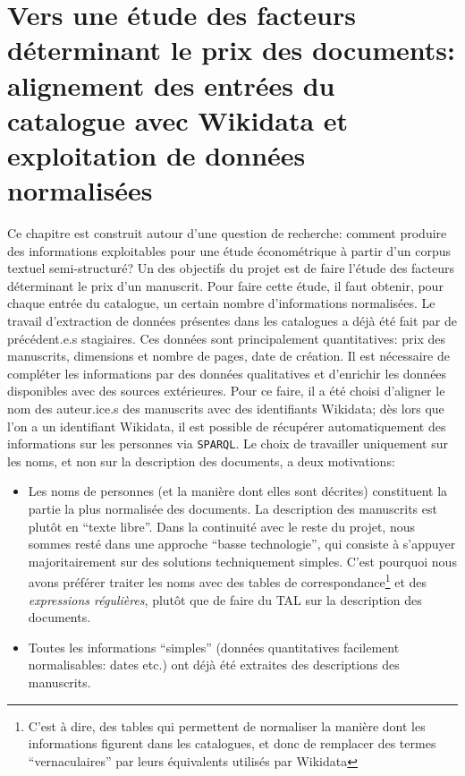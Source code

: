 \documentclass[a4paper, 12pt, twoside]{book}
\newcommand{\rgx}{\textit{expressions régulières}}
\newcommand{\sparql}{\texttt{SPARQL}}
\begin{document}
\chapter{Vers une étude des facteurs déterminant le prix des documents: alignement des entrées du catalogue avec Wikidata et exploitation de données normalisées}
Ce chapitre est construit autour d'une question de recherche: comment produire des informations exploitables pour une étude économétrique à partir d'un corpus textuel semi-structuré? Un des objectifs du projet est de faire l'étude des facteurs déterminant le prix d'un manuscrit. Pour faire cette étude, il faut obtenir, pour chaque entrée du catalogue, un certain nombre d'informations normalisées. Le travail d'extraction de données présentes dans les catalogues a déjà été fait par de précédent.e.s stagiaires. Ces données sont principalement quantitatives: prix des manuscrits, dimensions et nombre de pages, date de création. Il est nécessaire de compléter les informations par des données qualitatives et d'enrichir les données disponibles avec des sources extérieures. Pour ce faire, il a été choisi d'aligner le nom des auteur.ice.s des manuscrits avec des identifiants Wikidata; dès lors que l'on a un identifiant Wikidata, il est possible de récupérer automatiquement des informations sur les personnes via \sparql. Le choix de travailler uniquement sur les noms, et non sur la description des documents, a deux motivations:
\begin{itemize}
 \item Les noms de personnes (et la manière dont elles sont décrites) constituent la partie la plus normalisée des documents. La description des manuscrits est plutôt en \enquote{texte libre}. Dans la continuité avec le reste du projet, nous sommes resté dans une approche \enquote{basse technologie}, qui consiste à s'appuyer majoritairement sur des solutions techniquement simples. C'est pourquoi nous avons préférer traiter les noms avec des tables de correspondance\footnote{C'est à dire, des tables qui permettent de normaliser la manière dont les informations figurent dans les catalogues, et donc de remplacer des termes \enquote{vernaculaires} par leurs équivalents utilisés par Wikidata} et des \rgx{}, plutôt que de faire du TAL sur la description des documents.
 \item Toutes les informations \enquote{simples} (données quantitatives facilement normalisables: dates etc.) ont déjà été extraites des descriptions des manuscrits.
\end{itemize}
\end{document}
